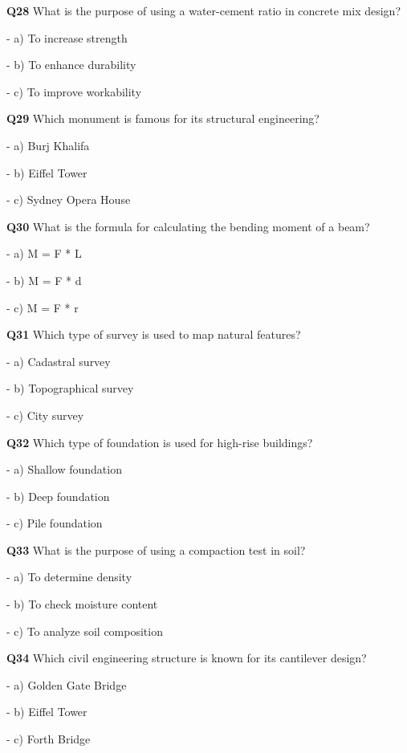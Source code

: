 \textbf{Q28} What is the purpose of using a water-cement ratio in concrete mix design?\par
\quad - a) To increase strength\par
\quad - b) To enhance durability\par
\quad - c) To improve workability\par

\textbf{Q29} Which monument is famous for its structural engineering?\par
\quad - a) Burj Khalifa\par
\quad - b) Eiffel Tower\par
\quad - c) Sydney Opera House\par

\textbf{Q30} What is the formula for calculating the bending moment of a beam?\par
\quad - a) M = F * L\par
\quad - b) M = F * d\par
\quad - c) M = F * r\par

\textbf{Q31} Which type of survey is used to map natural features?\par
\quad - a) Cadastral survey\par
\quad - b) Topographical survey\par
\quad - c) City survey\par

\textbf{Q32} Which type of foundation is used for high-rise buildings?\par
\quad - a) Shallow foundation\par
\quad - b) Deep foundation\par
\quad - c) Pile foundation\par

\textbf{Q33} What is the purpose of using a compaction test in soil?\par
\quad - a) To determine density\par
\quad - b) To check moisture content\par
\quad - c) To analyze soil composition\par

\textbf{Q34} Which civil engineering structure is known for its cantilever design?\par
\quad - a) Golden Gate Bridge\par
\quad - b) Eiffel Tower\par
\quad - c) Forth Bridge\par


